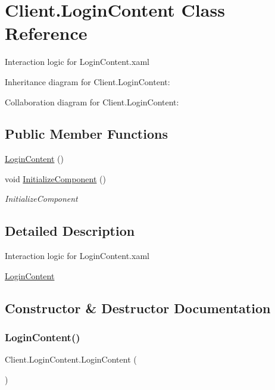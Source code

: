\hypertarget{class_client_1_1_login_content}{}\section{Client.\+Login\+Content Class Reference}
\label{class_client_1_1_login_content}


Interaction logic for Login\+Content.\+xaml  




Inheritance diagram for Client.\+Login\+Content\+:


Collaboration diagram for Client.\+Login\+Content\+:
\subsection*{Public Member Functions}
\begin{DoxyCompactItemize}
\item 
\hyperlink{class_client_1_1_login_content_a95b9f4d06cacee6548363e17323ff6df}{Login\+Content} ()
\item 
void \hyperlink{class_client_1_1_login_content_aab28ba890ab8be2085b04183cef1b696}{Initialize\+Component} ()
\begin{DoxyCompactList}\small\item\em Initialize\+Component \end{DoxyCompactList}\end{DoxyCompactItemize}


\subsection{Detailed Description}
Interaction logic for Login\+Content.\+xaml 

\hyperlink{class_client_1_1_login_content}{Login\+Content} 

\subsection{Constructor \& Destructor Documentation}
\mbox{\label{class_client_1_1_login_content_a95b9f4d06cacee6548363e17323ff6df}} 
\subsubsection{\texorpdfstring{Login\+Content()}{LoginContent()}}
{\footnotesize\ttfamily Client.\+Login\+Content.\+Login\+Content (\begin{DoxyParamCaption}{ }\end{DoxyParamCaption})\hspace{0.3cm}{\ttfamily [inline]}}

